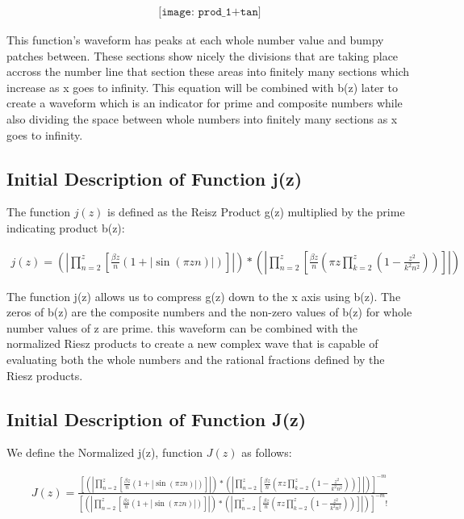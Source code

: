 \documentclass{article}
\begin{document}
\begin{align*}
\texttt{[image: prod\_1+tan]}
\end{align*}

This function's waveform has peaks at each whole number value and bumpy patches between. These sections show nicely the divisions that are taking place accross the number line that section these areas into finitely many sections which increase as x goes to infinity. This equation will be combined with b(z) later to create a waveform which is an indicator for prime and composite numbers while also dividing the space between whole numbers into finitely many sections as x goes to infinity. \\

\subsection*{Initial Description of Function j(z)}
The function $j(z)$ is defined as the Reisz Product g(z) multiplied by the prime indicating product b(z):

\begin{align*}
	j(z) = \left(|\prod_{n=2}^z\left[\frac{\beta z}{n}\left(1 + |\sin\left(\pi z n\right)|\right)\right]|\right)*\left(|\prod_{n=2}^z\left[\frac{\beta z}{n}\left({\pi z}\prod_{k=2}^z\left(1 - \frac{z^2}{k^2n^2}\right)\right)\right]|\right)
\end{align*} 

The function j(z) allows us to compress g(z) down to the x axis using b(z). The zeros of b(z) are the composite numbers and the non-zero values of b(z) for whole number values of z are prime. this waveform can be combined with the normalized Riesz products to create a new complex wave that is capable of evaluating both the whole numbers and the rational fractions defined by the Riesz products.

\subsection*{Initial Description of Function J(z)}
We define the Normalized j(z), function $J(z)$ as follows:

\begin{align*}
	J(z) = \frac{\left[\left(|\prod_{n=2}^z\left[\frac{\beta z}{n}\left(1 + |\sin\left(\pi z n\right)|\right)\right]|\right)*\left(|\prod_{n=2}^z\left[\frac{\beta z}{n}\left({\pi z}\prod_{k=2}^z\left(1 - \frac{z^2}{k^2n^2}\right)\right)\right]|\right)\right]^{-m}}{\left[\left(|\prod_{n=2}^z\left[\frac{\beta z}{n}\left(1 + |\sin\left(\pi z n\right)|\right)\right]|\right)*\left(|\prod_{n=2}^z\left[\frac{\beta z}{n}\left({\pi z}\prod_{k=2}^z\left(1 - \frac{z^2}{k^2n^2}\right)\right)\right]|\right)\right]^{-m}!}
\end{align*}
\end{document}
